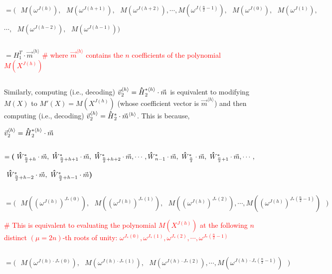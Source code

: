 $ $

$= \bm{(} \text{ } M(\omega^{J(h)}), \text{ } M(\omega^{J(h+1)}), \text{ } M(\omega^{J(h+2)}), \cdots, M(\omega^{J(\frac{n}{2}-1)}), \text{ } M(\omega^{J(0)}), \text{ }M(\omega^{J(1)}),$ 
                                    
$\cdots, \text{ } M(\omega^{J(h-2)}), \text{ } M(\omega^{J(h-1)})  \bm{)}$ 

$ $

$= H_1^{T}\cdot \vec{m}^{\langle h \rangle}$ \textcolor{red}{ \text{ } \# where $\vec{m}^{\langle h \rangle}$ contains the $n$ coefficients of the polynomial $M(X^{J(h)})$ }


$ $

Similarly, computing (i.e., decoding) $\vec{v}_2^{\langle h \rangle} = \hathat H_2^{*\langle h \rangle}\cdot \vec{m}$ is equivalent to modifying $M(X)$ to $M'(X) = M(X^{J(h)})$ (whose coefficient vector is $\vec{m}^{\langle h \rangle}$) and then computing (i.e., decoding) $\vec{v}_2^{\langle h \rangle} = \hathat H_2^{*}\cdot \vec{m}^{\langle h \rangle}$. This is because,

$\vec{v}_2^{\langle h \rangle} =\hathat H_2^{*\langle h \rangle}\cdot \vec{m}$

$ $


$ = \bm{(} \text{ } \hathat W^*_{\frac{n}{2} +h}\cdot\vec{m}, \text{ } \hathat W^*_{\frac{n}{2} + h+1}\cdot\vec{m}, \text{ } \hathat W^*_{\frac{n}{2} +h+2}\cdot\vec{m}, \cdots, \hathat W^*_{n -1}\cdot\vec{m}, \text{ } \hathat W^*_{\frac{n}{2}}\cdot\vec{m}, \text{ }\hathat W^*_{\frac{n}{2} + 1}\cdot\vec{m}, \cdots,$

\text{ }\text{ }\text{ }\text{ }$ \text{ } \hathat W^*_{\frac{n}{2} + h-2}\cdot\vec{m}, \text{ } \hathat W^*_{\frac{n}{2} + h-1}\cdot\vec{m}  \bm{)}$

$ $

$= \bm{(} \text{ } M((\omega^{J(h)})^{J_*(0)}), \text{ } M((\omega^{J(h)})^{J_*(1)}), \text{ } M((\omega^{J(h)})^{J_*(2)}), \cdots, M((\omega^{J(h)})^{J_*(\frac{n}{2}-1)}) \text{ } \bm{)}$


\textcolor{red}{\# This is equivalent to evaluating the polynomial $M(X^{J(h)})$ at the following $n$ distinct $(\mu=2n)$-th roots of unity: $\omega^{J_*(0)}, \omega^{J_*(1)},  \omega^{J_*(2)}, \cdots, \omega^{J_*(\frac{n}{2} - 1)}$}

$ $

$= \bm{(} \text{ } M(\omega^{J(h)\cdot J_*(0)}), \text{ } M(\omega^{J(h)\cdot J_*(1)}), \text{ } M(\omega^{J(h)\cdot J_*(2)}), \cdots, M(\omega^{J(h)\cdot J_*(\frac{n}{2}-1)}) \text{ } \bm{)}$

